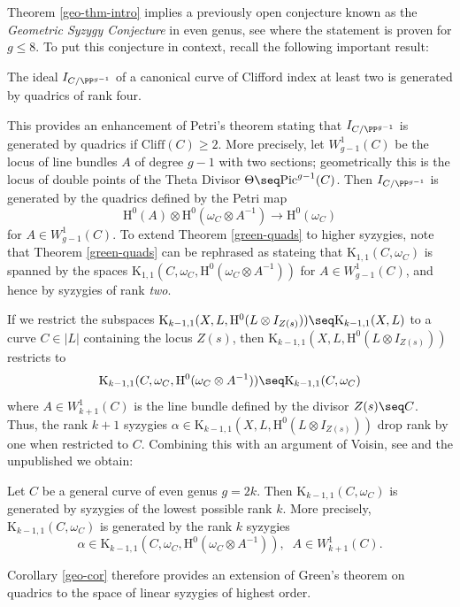 Theorem \ref{geo-thm-intro} implies a previously open conjecture known as the \emph{Geometric Syzygy Conjecture} in even genus, see \cite{bothmer-Transactions} where the statement is proven for $g \leq 8$.  To put this conjecture in context, recall the following important result:
 \begin{thm}
\notready \label{green-quads}
 The ideal $I_{C/\PP^{g-1}}$ of a canonical curve of Clifford index at least two is generated by quadrics of rank four.
 \end{thm}
 This provides an enhancement of Petri's theorem stating that $I_{C/\PP^{g-1}}$ is generated by quadrics if $\mathrm{Cliff}(C) \geq 2$. More precisely, let $W^1_{g-1}(C)$ be the locus of line bundles $A$ of degree $g-1$ with two sections; geometrically this is the locus of double points of the Theta Divisor $\Theta \seq \mathrm{Pic}^{g-1}(C)$. Then $I_{C/\PP^{g-1}}$ is generated by the quadrics defined by the Petri map
 $$\mathrm{H}^0(A) \otimes \mathrm{H}^0(\omega_C \otimes A^{-1}) \to \mathrm{H}^0(\omega_C)$$
 for $A \in W^1_{g-1}(C)$. To extend Theorem \ref{green-quads} to higher syzygies, note that Theorem \ref{green-quads} can be rephrased as stateing that $\mathrm{K}_{1,1}(C,\omega_C)$ is spanned by the spaces $\mathrm{K}_{1,1}(C,\omega_C, \mathrm{H}^0(\omega_C \otimes A^{-1} ))$ for $A \in W^1_{g-1}(C)$, and hence by syzygies of rank \emph{two}.


If we restrict the subspaces $\mathrm{K}_{k-1,1}(X,L,\mathrm{H}^0(L \otimes I_{Z(s)})) \seq \mathrm{K}_{k-1,1}(X,L)$ to a curve $C \in |L|$ containing the locus $Z(s)$, then $\mathrm{K}_{k-1,1}(X,L,\mathrm{H}^0(L \otimes I_{Z(s)}))$ restricts to
$$\mathrm{K}_{k-1,1}(C,\omega_C,\mathrm{H}^0(\omega_C \otimes A^{-1})) \seq \mathrm{K}_{k-1,1}(C,\omega_C)$$ where $A \in W^1_{k+1}(C)$ is the line bundle defined by the divisor $Z(s) \seq C$. Thus, the rank $k+1$ syzygies $\alpha \in \mathrm{K}_{k-1,1}(X,L,\mathrm{H}^0(L \otimes I_{Z(s)}))$ drop rank by one when restricted to $C$. Combining this with an argument of Voisin,  see \cite[Prop.\ 7]{V1} and the unpublished \cite[\S 11]{bothmer-preprint} we obtain:
\begin{cor}
\notready \label{geo-cor}
Let $C$ be a general curve of even genus $g=2k$. Then $\mathrm{K}_{k-1,1}(C,\omega_C)$ is generated by syzygies of the lowest possible rank $k$.  More precisely, $\mathrm{K}_{k-1,1}(C,\omega_C)$ is generated by the rank $k$ syzygies $$\alpha \in \mathrm{K}_{k-1,1}(C,\omega_C,\mathrm{H}^0(\omega_C \otimes A^{-1})), \; \; A \in W^1_{k+1}(C).$$
\end{cor}
Corollary \ref{geo-cor} therefore provides an extension of Green's theorem on quadrics \cite{green-quadrics} to the space of linear syzygies of highest order.

